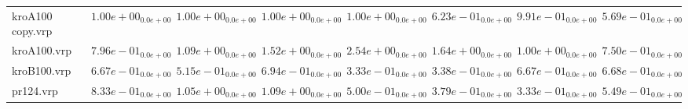 \documentclass{article}
\begin{document}
\begin{table}
\begin{scriptsize}
\begin{tabular}{llllllll}
kroA100 copy.vrp & $  1.00e+00_{ 0.0e+00}$ & $  1.00e+00_{ 0.0e+00}$ & $  1.00e+00_{ 0.0e+00}$ & $  1.00e+00_{ 0.0e+00}$ & \cellcolor{gray25}$  6.23e-01_{ 0.0e+00}$ & $  9.91e-01_{ 0.0e+00}$ & \cellcolor{gray95}$  5.69e-01_{ 0.0e+00}$ \\
kroA100.vrp & \cellcolor{gray25}$  7.96e-01_{ 0.0e+00}$ & $  1.09e+00_{ 0.0e+00}$ & $  1.52e+00_{ 0.0e+00}$ & $  2.54e+00_{ 0.0e+00}$ & $  1.64e+00_{ 0.0e+00}$ & $  1.00e+00_{ 0.0e+00}$ & \cellcolor{gray95}$  7.50e-01_{ 0.0e+00}$ \\
kroB100.vrp & $  6.67e-01_{ 0.0e+00}$ & $  5.15e-01_{ 0.0e+00}$ & $  6.94e-01_{ 0.0e+00}$ & \cellcolor{gray95}$  3.33e-01_{ 0.0e+00}$ & \cellcolor{gray25}$  3.38e-01_{ 0.0e+00}$ & $  6.67e-01_{ 0.0e+00}$ & $  6.68e-01_{ 0.0e+00}$ \\
pr124.vrp & $  8.33e-01_{ 0.0e+00}$ & $  1.05e+00_{ 0.0e+00}$ & $  1.09e+00_{ 0.0e+00}$ & $  5.00e-01_{ 0.0e+00}$ & \cellcolor{gray25}$  3.79e-01_{ 0.0e+00}$ & \cellcolor{gray95}$  3.33e-01_{ 0.0e+00}$ & $  5.49e-01_{ 0.0e+00}$ \\
\hline
\end{tabular}
\end{scriptsize}
\end{table}
\end{document}
